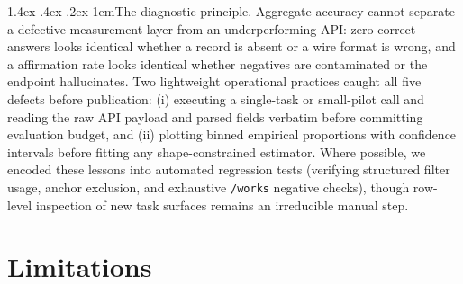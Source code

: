 \documentclass[11pt]{article}
\makeatletter
\renewcommand\paragraph{\@startsection{paragraph}{4}{\z@}%
  {1.4ex \@plus .4ex \@minus .2ex}{-1em}{\normalfont\normalsize\bfseries}}
\makeatother
\begin{document}
\paragraph{The diagnostic principle.}
Aggregate accuracy cannot separate a defective measurement layer from an underperforming API: zero correct answers looks identical whether a record is absent or a wire format is wrong, and a \tiRawNear{} affirmation rate looks identical whether negatives are contaminated or the endpoint hallucinates. Two lightweight operational practices caught all five defects before publication: (i) executing a single-task or small-pilot call and reading the raw API payload and parsed fields verbatim before committing evaluation budget, and (ii) plotting binned empirical proportions with confidence intervals before fitting any shape-constrained estimator. Where possible, we encoded these lessons into automated regression tests (verifying structured filter usage, anchor exclusion, and exhaustive \texttt{/works} negative checks), though row-level inspection of new task surfaces remains an irreducible manual step.

\section{Limitations}
\label{sec:limits}
\end{document}
